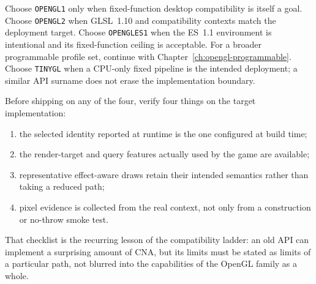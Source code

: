 Choose \texttt{OPENGL1} only when fixed-function desktop compatibility is itself a goal.
Choose \texttt{OPENGL2} when GLSL~1.10 and compatibility contexts match the deployment target.
Choose \texttt{OPENGLES1} when the ES~1.1 environment is intentional and its fixed-function
ceiling is acceptable. For a broader programmable profile set, continue with
Chapter~\ref{ch:opengl-programmable}. Choose \texttt{TINYGL} when a CPU-only fixed pipeline is
the intended deployment; a similar API surname does not erase the implementation
boundary.

Before shipping on any of the four, verify four things on the target implementation:

\begin{enumerate}
  \item the selected identity reported at runtime is the one configured at build time;
  \item the render-target and query features actually used by the game are available;
  \item representative effect-aware draws retain their intended semantics rather than taking
        a reduced path;
  \item pixel evidence is collected from the real context, not only from a construction or
        no-throw smoke test.
\end{enumerate}

That checklist is the recurring lesson of the compatibility ladder: an old API can implement
a surprising amount of CNA, but its limits must be stated as limits of a particular path,
not blurred into the capabilities of the OpenGL family as a whole.

